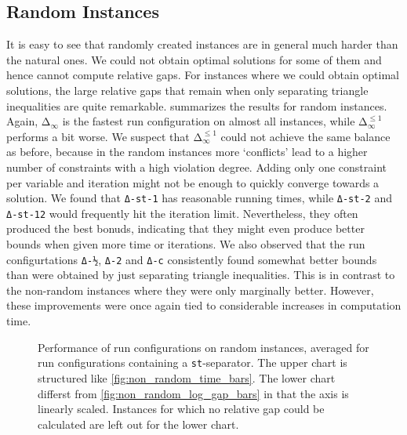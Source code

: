\subsection{Random Instances}
It is easy to see that randomly created instances are in general much harder than the natural ones.
We could not obtain optimal solutions for some of them and hence cannot compute relative gaps.
For instances where we could obtain optimal solutions, the large relative gaps that remain when only separating triangle inequalities are quite remarkable.
 summarizes the results for random instances.
Again, $\texttt{Δ}_{\infty}$ is the fastest run configuration on almost all instances, while $\texttt{Δ}_{\infty}^{\leq 1}$ performs a bit worse.
We suspect that $\texttt{Δ}_{\infty}^{\leq 1}$ could not achieve the same balance as before, because in the random instances more ‘conflicts’ lead to a higher number of constraints with a high violation degree.
Adding only one constraint per variable and iteration might not be enough to quickly converge towards a solution.
We found that \texttt{Δ-st-1} has reasonable running times, while \texttt{Δ-st-2} and \texttt{Δ-st-12} would frequently hit the iteration limit.
Nevertheless, they often produced the best bonuds, indicating that they might even produce better bounds when given more time or iterations.
We also observed that the run configurtations \texttt{Δ-½}, \texttt{Δ-2} and \texttt{Δ-c} consistently found somewhat better bounds than were obtained by just separating triangle inequalities.
This is in contrast to the non-random instances where they were only marginally better.
However, these improvements were once again tied to considerable increases in computation time.

\begin{figure}[H]
	\centering
	\resizebox{0.95\linewidth}{!}{
	}
	\bigskip
	\caption[Performance on random data]{Performance of run configurations on random instances, averaged for run configurations containing a \texttt{st}-separator.
		The upper chart is structured like \cref{fig:non_random_time_bars}.
		The lower chart differst from \cref{fig:non_random_log_gap_bars} in that the axis is linearly scaled.
		Instances for which no relative gap could be calculated are left out for the lower chart.
	}
	\label{fig:random_time_and_gap_bars}
\end{figure}
